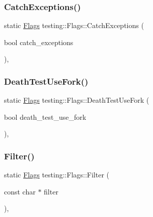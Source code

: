 \mbox{\label{structtesting_1_1Flags_a2c7d89f62f4328ae0ced66154ef96b44}} 
\subsubsection{\texorpdfstring{CatchExceptions()}{CatchExceptions()}}
{\footnotesize\ttfamily static \mbox{\hyperlink{structtesting_1_1Flags}{Flags}} testing\+::\+Flags\+::\+Catch\+Exceptions (\begin{DoxyParamCaption}\item[{bool}]{catch\+\_\+exceptions }\end{DoxyParamCaption})\hspace{0.3cm}{\ttfamily [inline]}, {\ttfamily [static]}}

\mbox{\label{structtesting_1_1Flags_a4468e5625833043596c44be174349d8c}} 
\subsubsection{\texorpdfstring{DeathTestUseFork()}{DeathTestUseFork()}}
{\footnotesize\ttfamily static \mbox{\hyperlink{structtesting_1_1Flags}{Flags}} testing\+::\+Flags\+::\+Death\+Test\+Use\+Fork (\begin{DoxyParamCaption}\item[{bool}]{death\+\_\+test\+\_\+use\+\_\+fork }\end{DoxyParamCaption})\hspace{0.3cm}{\ttfamily [inline]}, {\ttfamily [static]}}

\mbox{\label{structtesting_1_1Flags_afc7350b7c1ac4c0e0efe2d9a94729eb7}} 
\subsubsection{\texorpdfstring{Filter()}{Filter()}}
{\footnotesize\ttfamily static \mbox{\hyperlink{structtesting_1_1Flags}{Flags}} testing\+::\+Flags\+::\+Filter (\begin{DoxyParamCaption}\item[{const char $\ast$}]{filter }\end{DoxyParamCaption})\hspace{0.3cm}{\ttfamily [inline]}, {\ttfamily [static]}}

